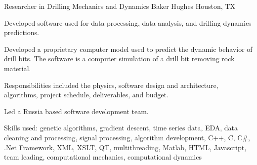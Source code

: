 \documentclass{leresume}
\begin{document}
            {Researcher in Drilling Mechanics and Dynamics}
            {Baker Hughes}
			{Houston, TX}
			
				Developed software used for data processing, data analysis, and drilling dynamics predictions.
			
		\begin{bulletedlist}
			
		\item
		
					Developed a proprietary computer model used to predict the dynamic behavior of drill bits.  The software is a computer simulation of a drill bit removing rock material.
					
		\begin{bulletedlist}
			
		\item
		
							Responsibilities included the physics, software design and architecture, algorithms, project schedule, deliverables, and budget.
						
		\item
		
							Led a Russia based software development team.
						
		\item
		
							Skills used: genetic algorithms, gradient descent, time series data, EDA, data cleaning and processing, signal processing, algorithm development, C++, C, C\#, .Net Framework, XML, XSLT, QT, multithreading, Matlab, HTML, Javascript, team leading, computational mechanics, computational dynamics
						
		\end{bulletedlist}
	
		\end{bulletedlist}
	

    
    
    
    
    
    
    
    
\end{document}
